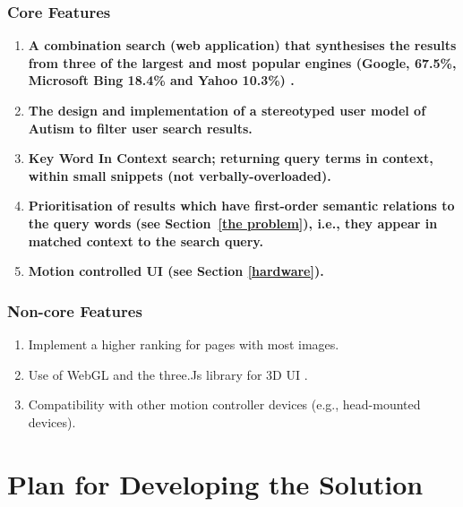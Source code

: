 \documentclass[a4paper, 10pt]{article}
\begin{document}
\subsubsection{Core Features}\label{core}
\begin{enumerate}
\item  \textbf{A combination search (web application) that synthesises the results from three of the largest and most popular engines (Google, 67.5\%, Microsoft Bing 18.4\% and Yahoo 10.3\%) \cite{adam}.}

\item \textbf{The design and implementation of a stereotyped user model of Autism to filter user search results.}

\item \textbf{Key Word In Context search; returning query terms in context, within small snippets (not verbally-overloaded).}

\item \textbf{Prioritisation of results which have first-order semantic relations to the query words (see Section~\ref{the problem}), i.e., they appear in matched context to the search query.}

\item \textbf{Motion controlled UI (see Section \ref{hardware}).}
\end{enumerate}

\subsubsection{Non-core Features}
\begin{enumerate}

\item Implement a higher ranking for pages with most images. 
\item Use of WebGL and the three.Js library for 3D UI .
\item Compatibility with other motion controller devices (e.g., head-mounted devices).

\end{enumerate}

\section{Plan for Developing the Solution}\label{sol}
\end{document}
